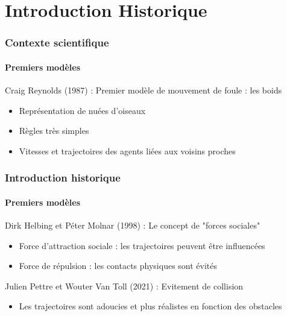 \section{Introduction Historique}

\begin{frame}
\frametitle{Contexte scientifique }
\framesubtitle{Premiers modèles}

Craig Reynolds (1987) : Premier modèle de mouvement de foule : les boids


\begin{itemize}
	\item	<2->	Représentation de nuées d’oiseaux
	\item	<3->	Règles très simples
	\item   <4->      Vitesses et trajectoires des agents liées aux voisins proches

	
\end{itemize}

\end{frame}


\begin{frame}
\frametitle{Introduction historique}
\framesubtitle{Premiers modèles}

Dirk Helbing et Péter Molnar (1998) : Le concept de "forces sociales"


\begin{itemize}
	\item	<2->	Force d’attraction sociale : les trajectoires peuvent être influencées

	\item	<3->	Force de répulsion : les contacts physiques sont évités
 \end{itemize}
\bigskip
{} Julien Pettre et Wouter Van Toll (2021) : Evitement de collision

 \begin{itemize}
     \item <5-> Les trajectoires sont adoucies et plus réalistes en fonction des obstacles
 \end{itemize}	

\end{frame}


